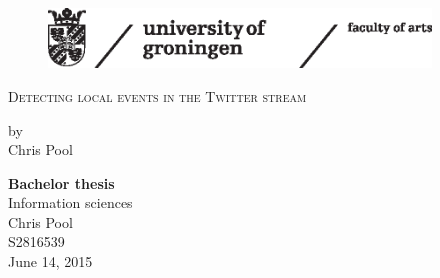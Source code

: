 
\begin{titlepage}

\begin{figure}[h!] %

 \includegraphics[width=4in]{Figures/ruglogo.eps} 
\end{figure}
\begin{center}

\vspace{30 mm}
\begingroup \linespread{1,75} \selectfont 
\textsc{\LARGE Detecting local events in the Twitter stream}\\[1,5cm]
\endgroup


by\\[0,5cm]
Chris Pool\\[2,5cm]


\end{center}
\vfill
\textbf{Bachelor thesis}\\
Information sciences\\
Chris Pool\\
S2816539\\
June 14, 2015



\end{titlepage}